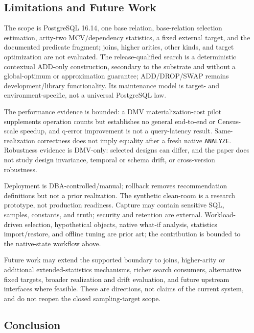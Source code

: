 \subsection{Limitations and Future Work}

The scope is PostgreSQL 16.14, one base relation, base-relation selection
estimation, arity-two MCV/dependency statistics, a fixed external target, and
the documented predicate fragment; joins, higher arities, other kinds, and
target optimization are not evaluated.  The release-qualified search is a
deterministic contextual ADD-only construction, secondary to the substrate and
without a global-optimum or approximation guarantee; ADD/DROP/SWAP remains
development/library functionality.  Its maintenance model is target- and
environment-specific, not a universal PostgreSQL law.

The performance evidence is bounded: a DMV materialization-cost pilot
supplements operation counts but establishes no general end-to-end or
Census-scale speedup, and q-error improvement is not a query-latency result.
Same-realization correctness does not imply equality after a fresh native
\texttt{ANALYZE}.  Robustness evidence is DMV-only: selected designs can
differ, and the paper does not study design invariance, temporal or schema
drift, or cross-version robustness.

Deployment is DBA-controlled/manual; rollback removes recommendation
definitions but not a prior realization.  The synthetic clean-room is a
research prototype, not production readiness.  Capture may contain sensitive
SQL, samples, constants, and truth; security and retention are external.
Workload-driven selection, hypothetical objects, native what-if analysis,
statistics import/restore, and offline tuning are prior art; the contribution
is bounded to the native-state workflow above.

Future work may extend the supported boundary to joins, higher-arity or
additional extended-statistics mechanisms, richer search consumers,
alternative fixed targets, broader realization and drift evaluation, and
future upstream interfaces where feasible.  These are directions, not claims
of the current system, and do not reopen the closed sampling-target scope.

\subsection{Conclusion}


